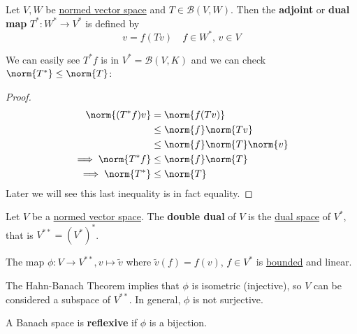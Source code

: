 \documentclass{article}
\begin{document}
\begin{defi}
    Let $V, W$ be \hyperlink{def:normedVectorSpace}{normed vector space} and $T \in \mathcal{B}(V, W)$. Then the \textbf{adjoint} or \textbf{dual map} $T^*: W^* \to V^*$ is defined by
    \begin{equation*}
        [T^* f] v = f(T v) \quad f \in W^*, \, v \in V
    \end{equation*}
\end{defi}

\begin{fact}
    We can easily see $T^* f$ is in $V^* = \mathcal{B}(V, K)$ and we can check $\norm{T^*} \leq \norm{T}$:
\end{fact}

\begin{proof}
    \begin{align*}
        \norm{(T^* f) v} &= \norm{f(T v)} \\
                         &\leq \norm{f} \norm{Tv} \\
                         &\leq \norm{f} \norm{T} \norm{v} \\
        \implies \norm{T^* f} &\leq \norm{f} \norm{T} \\
        \implies \norm{T^*} &\leq \norm{T} \\
    \end{align*}
    Later we will see this last inequality is in fact equality.
\end{proof}


\begin{defi}
    Let $V$ be a \hyperlink{def:normedVectorSpace}{normed vector space}. The \textbf{double dual} of $V$ is the \hyperlink{def:dualSpace}{dual space} of $V^*$, that is $V^{**} = (V^*)^*$.
\end{defi}

\begin{fact}
    The map $\phi: V \to V^{**}, v \mapsto \widetilde v$ where $\widetilde v(f) = f(v)$, $f \in V^*$ is \hyperlink{def:boundedLinearMap}{bounded} and linear.
\end{fact}

\begin{remark}
    The Hahn-Banach Theorem implies that $\phi$ is isometric (injective), so $V$ can be considered a subspace of $V^{**}$. In general, $\phi$ is not surjective.
\end{remark}

\begin{defi}
    A Banach space is \textbf{reflexive} if $\phi$ is a bijection.
\end{defi}
\end{document}
